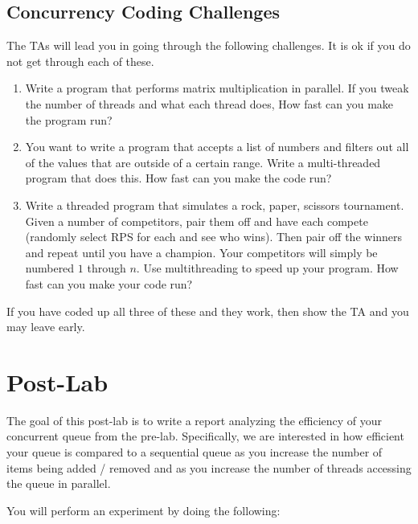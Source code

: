 \documentclass[paper=a4, fontsize=11pt, parskip=full]{scrartcl} %
\numberwithin{equation}{section} %
\numberwithin{figure}{section} %
\numberwithin{table}{section} %
\begin{document}
\subsection{Concurrency Coding Challenges}

The TAs will lead you in going through the following challenges. It is ok if you do not get through each of these.

\begin{enumerate}
	\item Write a program that performs matrix multiplication in parallel. If you tweak the number of threads and what each thread does, How fast can you make the program run?
	\item You want to write a program that accepts a list of numbers and filters out all of the values that are outside of a certain range. Write a multi-threaded program that does this. How fast can you make the code run?
	\item Write a threaded program that simulates a rock, paper, scissors tournament. Given a number of competitors, pair them off and have each compete (randomly select RPS for each and see who wins). Then pair off the winners and repeat until you have a champion. Your competitors will simply be numbered $1$ through $n$. Use multithreading to speed up your program. How fast can you make your code run?
\end{enumerate}

If you have coded up all three of these and they work, then show the TA and you may leave early.




\newpage
\section{Post-Lab}

The goal of this post-lab is to write a report analyzing the efficiency of your concurrent queue from the pre-lab. Specifically, we are interested in how efficient your queue is compared to a sequential queue as you increase the number of items being added / removed and as you increase the number of threads accessing the queue in parallel.

You will perform an experiment by doing the following:
\end{document}
